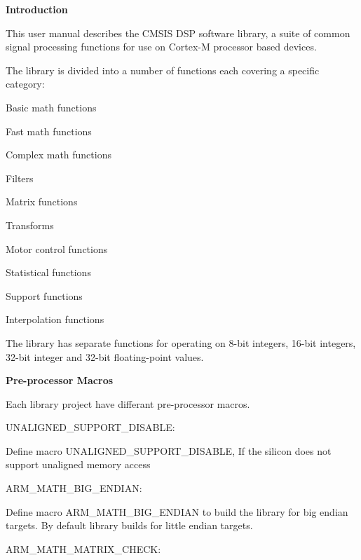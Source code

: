 {\bfseries Introduction}

This user manual describes the C\-M\-S\-I\-S D\-S\-P software library, a suite of common signal processing functions for use on Cortex-\/\-M processor based devices.

The library is divided into a number of functions each covering a specific category\-:
\begin{DoxyItemize}
\item Basic math functions
\item Fast math functions
\item Complex math functions
\item Filters
\item Matrix functions
\item Transforms
\item Motor control functions
\item Statistical functions
\item Support functions
\item Interpolation functions
\end{DoxyItemize}

The library has separate functions for operating on 8-\/bit integers, 16-\/bit integers, 32-\/bit integer and 32-\/bit floating-\/point values.

{\bfseries Pre-\/processor Macros}

Each library project have differant pre-\/processor macros.


\begin{DoxyItemize}
\item U\-N\-A\-L\-I\-G\-N\-E\-D\-\_\-\-S\-U\-P\-P\-O\-R\-T\-\_\-\-D\-I\-S\-A\-B\-L\-E\-:
\end{DoxyItemize}

Define macro U\-N\-A\-L\-I\-G\-N\-E\-D\-\_\-\-S\-U\-P\-P\-O\-R\-T\-\_\-\-D\-I\-S\-A\-B\-L\-E, If the silicon does not support unaligned memory access


\begin{DoxyItemize}
\item A\-R\-M\-\_\-\-M\-A\-T\-H\-\_\-\-B\-I\-G\-\_\-\-E\-N\-D\-I\-A\-N\-:
\end{DoxyItemize}

Define macro A\-R\-M\-\_\-\-M\-A\-T\-H\-\_\-\-B\-I\-G\-\_\-\-E\-N\-D\-I\-A\-N to build the library for big endian targets. By default library builds for little endian targets.


\begin{DoxyItemize}
\item A\-R\-M\-\_\-\-M\-A\-T\-H\-\_\-\-M\-A\-T\-R\-I\-X\-\_\-\-C\-H\-E\-C\-K\-:
\end{DoxyItemize}

